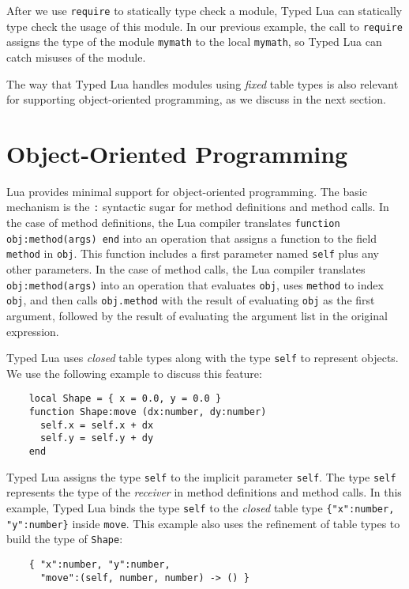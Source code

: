 After we use \texttt{require} to statically type check a module,
Typed Lua can statically type check the usage of this module.
In our previous example, the call to \texttt{require} assigns the type
of the module \texttt{mymath} to the local \texttt{mymath},
so Typed Lua can catch misuses of the module.

The way that Typed Lua handles modules using \emph{fixed} table types is
also relevant for supporting object-oriented programming, as we discuss in
the next section.

\section{Object-Oriented Programming}
\label{sec:oop}

Lua provides minimal support for object-oriented programming.
The basic mechanism is the \texttt{:} syntactic sugar for method
definitions and method calls.
In the case of method definitions, the Lua compiler translates
\texttt{function obj:method(args) end} into an operation that
assigns a function to the field \texttt{method} in \texttt{obj}.
This function includes a first parameter named \texttt{self} plus
any other parameters.
In the case of method calls, the Lua compiler translates
\texttt{obj:method(args)} into an operation that evaluates
\texttt{obj}, uses \texttt{method} to index \texttt{obj},
and then calls \texttt{obj.method} with the result of evaluating
\texttt{obj} as the first argument, followed by the result of
evaluating the argument list in the original expression.

Typed Lua uses \emph{closed} table types along with the type
\texttt{self} to represent objects.
We use the following example to discuss this feature:
\begin{verbatim}
    local Shape = { x = 0.0, y = 0.0 }
    function Shape:move (dx:number, dy:number)
      self.x = self.x + dx
      self.y = self.y + dy
    end
\end{verbatim}

Typed Lua assigns the type \texttt{self} to the implicit parameter \texttt{self}.
The type \texttt{self} represents the type of the \emph{receiver}
in method definitions and method calls.
In this example, Typed Lua binds the type \texttt{self} to
the \emph{closed} table type \texttt{\{"x":number, "y":number\}} inside \texttt{move}.
This example also uses the refinement of table types to build the
type of \texttt{Shape}:
\begin{verbatim}
    { "x":number, "y":number,
      "move":(self, number, number) -> () }
\end{verbatim}

